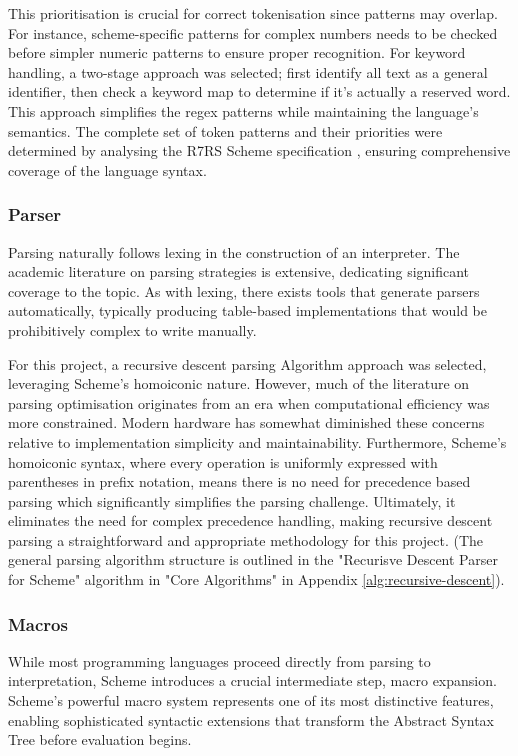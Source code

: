 \documentclass[final]{cmpreport_02}
\begin{document}
This prioritisation is crucial for correct tokenisation since patterns may overlap. For instance, scheme-specific patterns for complex numbers needs to be checked before simpler numeric patterns to ensure proper recognition.
For keyword handling, a two-stage approach was selected; first identify all text as a general identifier, then check a keyword map to determine if it's actually a reserved word. This approach simplifies the regex patterns while maintaining the language's semantics.
The complete set of token patterns and their priorities were determined by analysing the R7RS Scheme specification \cite{r7rs}, ensuring comprehensive coverage of the language syntax.

\subsubsection{Parser}
Parsing naturally follows lexing in the construction of an interpreter. The academic literature on parsing strategies is extensive, \cite{aho2006compilers} dedicating significant coverage to the topic. 
As with lexing, there exists tools that generate parsers automatically, typically producing table-based implementations that would be prohibitively complex to write manually.\newline 

For this project, a recursive descent parsing Algorithm approach was selected, leveraging Scheme's homoiconic nature. 
However, much of the literature on parsing optimisation originates from an era when computational efficiency was more constrained. Modern hardware has somewhat diminished these concerns relative to implementation simplicity and maintainability.
Furthermore, Scheme's homoiconic syntax, where every operation is uniformly expressed with parentheses in prefix notation, means there is no need for precedence based parsing which significantly simplifies the parsing challenge. Ultimately, it eliminates the need for complex precedence handling, making recursive descent parsing a straightforward and appropriate methodology for this project. 
(The general parsing algorithm structure is outlined in the "Recurisve Descent Parser for Scheme" algorithm in "Core Algorithms" in Appendix \ref{alg:recursive-descent}).

\subsubsection{Macros}
While most programming languages proceed directly from parsing to interpretation, Scheme introduces a crucial intermediate step, macro expansion. Scheme's powerful macro system represents one of its most distinctive features, enabling sophisticated syntactic extensions that transform the Abstract Syntax Tree before evaluation begins.
\end{document}
